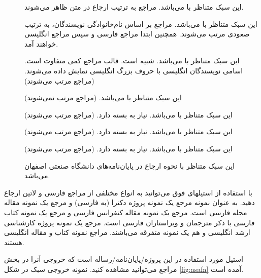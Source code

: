 \singlespacing
\begin{description}
\item [] این سبک متناظر با  می‌باشد. مراجع به ترتیب ارجاع در متن ظاهر می‌شوند.
\item [] این سبک متناظر با  می‌باشد. مراجع بر اساس نام‌خانوادگی نویسندگان، به ترتیب صعودی مرتب می‌شوند.
 همچنین ابتدا مراجع فارسی و سپس مراجع انگلیسی خواهند آمد.
\item [] این سبک متناظر با  می‌باشد. شبیه  است.  قالب مراجع کمی متفاوت است. اسامی نویسندگان انگلیسی با حروف بزرگ انگلیسی نمایش داده می‌شوند. (مراجع مرتب می‌شوند)
\item [] این سبک متناظر با  می‌باشد. (مراجع مرتب نمی‌شوند)
\item [] این سبک متناظر با  می‌باشد. نیاز به بسته  دارد. (مراجع مرتب می‌شوند)
\item [] این سبک متناظر با  می‌باشد. نیاز به بسته  دارد. (مراجع مرتب می‌شوند)
\item [] این سبک متناظر با  می‌باشد. نیاز به بسته  دارد. (مراجع مرتب می‌شوند)
\item[] این سبک متناظر با نحوه ارجاع در پایان‌نامه‌های دانشگاه صنعتی اصفهان می‌باشد.
\end{description}
\doublespacing

با استفاده از استیلهای فوق می‌توانید به انواع مختلفی از مراجع فارسی و لاتین ارجاع دهید. به عنوان نمونه مرجع 
\cite{Omidali82phdThesis}
 یک نمونه پروژه دکترا (به فارسی) و مرجع 
\cite{Vahedi87} یک نمونه مقاله مجله فارسی است.
مرجع 
\cite{Amintoosi87afzayesh}  یک نمونه  مقاله کنفرانس فارسی و
مرجع 
\cite{Pedram80osool} یک نمونه کتاب فارسی با ذکر مترجمان و ویراستاران فارسی است. مرجع 
\cite{Khalighi07MscThesis} یک نمونه پروژه کارشناسی ارشد انگلیسی و
\cite{Khalighi87xepersian} هم یک نمونه متفرقه  می‌باشند.
مراجع 
\cite{Gonzalez02book,Baker02limits} 
نمونه کتاب و مقاله انگلیسی هستند.

استیل مورد استفاده در این پروژه/پایان‌نامه/رساله 
است که خروجی آنرا در بخش مراجع می‌توانید مشاهده کنید.
نمونه  خروجی سبک  در شکل \ref{fig:asafa} آمده است.

